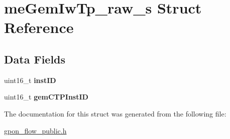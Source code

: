 \hypertarget{structmeGemIwTp__raw__s}{}\section{me\+Gem\+Iw\+Tp\+\_\+raw\+\_\+s Struct Reference}
\label{structmeGemIwTp__raw__s}
\subsection*{Data Fields}
\begin{DoxyCompactItemize}
\item 
\mbox{\label{structmeGemIwTp__raw__s_af2881bd35ae2af93aaa005d603e97495}} 
uint16\+\_\+t {\bfseries inst\+ID}
\item 
\mbox{\label{structmeGemIwTp__raw__s_a5e7f9dd4a73b425ea1ead28ec0a3c6ea}} 
uint16\+\_\+t {\bfseries gem\+C\+T\+P\+Inst\+ID}
\end{DoxyCompactItemize}


The documentation for this struct was generated from the following file\+:\begin{DoxyCompactItemize}
\item 
\hyperlink{gpon__flow__public_8h}{gpon\+\_\+flow\+\_\+public.\+h}\end{DoxyCompactItemize}
